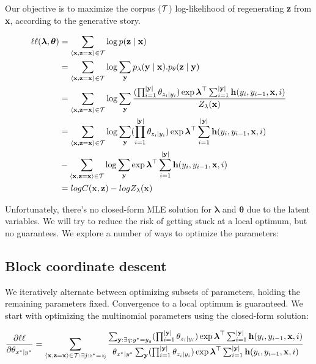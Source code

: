 \documentclass[11pt,onecolumn]{article}
\begin{document}
Our objective is to maximize the corpus ($\cal{T}$) log-likelihood of regenerating \textbf{z} from \textbf{x}, according to the generative story.

\begin{align}
\ell\ell(\boldsymbol{\lambda}, \boldsymbol{\theta}) &= \sum_{\langle\mathbf{x},\mathbf{z}=\mathbf{x}\rangle \in \cal{T}} \log p(\mathbf{z}\mid\mathbf{x}) \\
 &= \sum_{\langle\mathbf{x},\mathbf{z}=\mathbf{x}\rangle \in \cal{T}} \log \sum_{\mathbf{y}} p_\lambda(\mathbf{y}\mid\mathbf{x}).p_\theta(\mathbf{z}\mid\mathbf{y}) \\
 &= \sum_{\langle\mathbf{x},\mathbf{z}=\mathbf{x}\rangle \in \cal{T}} \log \sum_{\mathbf{y}} \frac{(\prod_{i=1}^{|\mathbf{y}|} \theta_{z_i\mid y_i}) \exp \boldsymbol{\lambda}^\top \sum_{i=1}^{|\mathbf{y}|} \mathbf{h}(y_i, y_{i-1}, \mathbf{x}, i)}{Z_\lambda(\mathbf{x})} \\
&= \sum_{\langle\mathbf{x},\mathbf{z}=\mathbf{x}\rangle \in \cal{T}} \log \sum_{\mathbf{y}} (\prod_{i=1}^{|\mathbf{y}|} \theta_{z_i\mid y_i}) \exp \boldsymbol{\lambda}^\top \sum_{i=1}^{|\mathbf{y}|} \mathbf{h}(y_i, y_{i-1}, \mathbf{x}, i) \nonumber \\
 &- \sum_{\langle\mathbf{x},\mathbf{z}=\mathbf{x}\rangle \in \cal{T}} \log \sum_{\mathbf{y}} \exp \boldsymbol{\lambda}^\top \sum_{i=1}^{|\mathbf{y}|} \mathbf{h}(y_i, y_{i-1}, \mathbf{x}, i) \\
 &= log C(\mathbf{x}, \mathbf{z}) - log Z_\lambda(\mathbf{x})
\end{align}

Unfortunately, there's no closed-form MLE solution for $\boldsymbol{\lambda}$ and $\boldsymbol{\theta}$ due to the latent variables. We will try to reduce the risk of getting stuck at a local optimum, but no guarantees. We explore a number of ways to optimize the parameters:

\subsection{Block coordinate descent}

We iteratively alternate between optimizing subsets of parameters, holding the remaining parameters fixed. Convergence to a local optimum is guaranteed. We start with optimizing the multinomial parameters using the closed-form solution:

\begin{align}
\frac{\partial \ell\ell}{\partial \theta_{x^*|y^*}} &= \sum_{\langle\mathbf{x},\mathbf{z}=\mathbf{x}\rangle \in \cal{T} : \exists \mathit{j} : \mathit{z}^* = \mathit{z}_\mathit{j} } \frac{\sum_{\mathbf{y}:\exists q:y^*=y_q} (\prod_{i=1}^{|\mathbf{y}|} \theta_{z_i\mid y_i}) \exp \boldsymbol{\lambda}^\top \sum_{i=1}^{|\mathbf{y}|} \mathbf{h}(y_i, y_{i-1}, \mathbf{x}, i) }{\theta_{x^*|y^*} \sum_{\mathbf{y}} (\prod_{i=1}^{|\mathbf{y}|} \theta_{z_i\mid y_i}) \exp \boldsymbol{\lambda}^\top \sum_{i=1}^{|\mathbf{y}|} \mathbf{h}(y_i, y_{i-1}, \mathbf{x}, i)}
\end{align}
\end{document}
